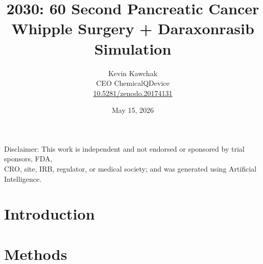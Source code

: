 \documentclass[11pt]{article}
\title{2030: 60 Second Pancreatic Cancer\\Whipple Surgery + Daraxonrasib Simulation}
\author{
  Kevin Kawchak\hspace{2pt}\orcidicon{0009-0007-5457-8667} \\
  CEO ChemicalQDevice\\
  \href{https://doi.org/10.5281/zenodo.20174131}{10.5281/zenodo.20174131} \\
}
\date{May 15, 2026}
\begin{document}
\maketitle

\begin{abstract}

\end{abstract}

\begin{center}
\normalsize
Disclaimer: This work is independent and not endorsed or sponsored by
trial sponsors, FDA,\\CRO, site, IRB, regulator, or medical society;
and was generated using Artificial Intelligence.
\end{center}


\vspace{-0.2cm}

\section{Introduction}
\label{sec:introduction}


\tableofcontents

\vspace{0.4cm}

\newpage
\section{Methods}
\label{sec:methods}

\newpage
\end{document}
